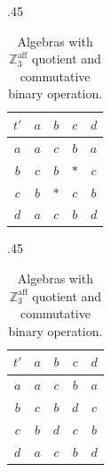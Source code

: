 \documentclass[11pt]{amsart}
\newcommand{\m}[1]{\mathbf{\uppercase{#1}}}
\theoremstyle{definition}
\theoremstyle{remark}
\theoremstyle{plain}
\begin{document}
\begin{table}[H]
\begin{subtable}{.45\linewidth}
\centering
 \begin{tabular}{c|c c c c}

    $t'$ & $a$ & $b$& $c$  & $d$\\
\hline

    $a$ & $a$ & $c$ & $b$ & $a$  \\

	$b$ & $c$ & $b$ & $\ast$ & $c$ \\
	
	$c$ & $b$ & $\ast$ & $c$ & $b$\\
	
	$d$ & $a$ & $c$ & $b$ & $d$
\end{tabular}  
\caption{General case}
\label{table:8}
\end{subtable}
\begin{subtable}{.45\linewidth}
\centering
 \begin{tabular}{c|c c c c}

    $t'$ & $a$ & $b$& $c$  & $d$\\
\hline

    $a$ & $a$ & $c$ & $b$ & $a$  \\

	$b$ & $c$ & $b$ & $d$ & $c$ \\
	
	$c$ & $b$ & $d$ & $c$ & $b$\\
	
	$d$ & $a$ & $c$ & $b$ & $d$
\end{tabular}  
\caption{Algebra $\m t_{4,14}$ ($\ast=d$)}
\label{table:9}
\end{subtable}
\caption{Algebras with $\mathbb{Z}^{\text{aff}}_3$ quotient and commutative binary operation.}
\end{table}
\end{document}
